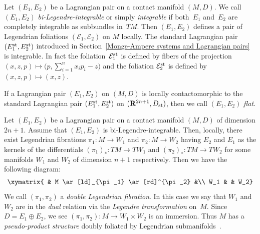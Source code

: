 \documentclass[pdftex]{sigma}
\begin{document}
Let $(E_1,E_2)$ be a Lagrangian pair on a contact manifold
$(M, D)$. We call $(E_1,E_2)$
{\it bi-Legendre-integrable} or simply {\it integrable} if
both~$E_1$ and~$E_2$
are completely integrable as subbundles in~$TM$.
Then $(E_1, E_2)$ def\/ines a pair of Legendrian foliations
$({\mathcal E}_1, {\mathcal E}_2)$ on $M$ locally.
The standard Lagrangian pair $(E^{\rm{st}}_1, E^{\rm{st}}_2)$ introduced in
Section~\ref{Monge-Ampere systems and Lagrangian pairs}
is integrable. In fact the foliation~${\mathcal E}^{\rm{st}}_1$
is def\/ined by f\/ibers of the projection
$(x, z, p) \mapsto \Big(p, \sum\limits_{i=1}^n x_ip_i - z\Big)$
and the foliation ${\mathcal E}^{\rm{st}}_2$
is def\/ined by $(x, z, p) \mapsto (x, z)$.

\begin{Def}
If a Lagrangian pair $(E_1,E_2)$ on $(M, D)$
is locally contactomorphic to the standard Lagrangian pair
$(E^{\rm{st}}_1, E^{\rm{st}}_2)$ on $({\mathbf{R}}^{2n+1}, D_{\rm{st}})$,
then we call $(E_1, E_2)$ {\it flat}.
\end{Def}

Let $(E_1, E_2)$ be a Lagrangian pair
on a contact manifold $(M, D)$ of dimension $2n + 1$.
Assume that $(E_1, E_2)$ is bi-Legendre-integrable.
Then, locally, there exist Legendrian f\/ibrations
\mbox{$\pi_1 \colon  M \to W_1$}
and $\pi_2 \colon  M \to W_2$ having
$E_2$ and $E_1$ as the kernels
of the dif\/ferentials $(\pi_1)_* \colon  TM
\to TW_1$
and $(\pi_2)_* \colon  TM
\to TW_2$
for some manifolds $W_1$ and $W_2$ of dimension $n+1$
respectively.
Then we have the following diagram:
\begin{gather*}
\xymatrix{
& M \ar[ld]_{\pi_1} \ar[rd]^{\pi_2}  &\\
W_1 &  & W_2}
\end{gather*}
We call $(\pi_1, \pi_2)$ a {\it
double Legendrian fibration}.
In this case we say that $W_1$ and $W_2$ are in
the {\it dual} relation via the {\it Legendre transformation} on~$M$.
Since $D = E_1\oplus E_2$,
we see $(\pi_1, \pi_2)\colon M \to W_1\times W_2$
is an immersion. Thus $M$ has a {\it pseudo-product structure}
doubly foliated by Legendrian submanifolds~\cite{Tab, Tan1}.
\end{document}
